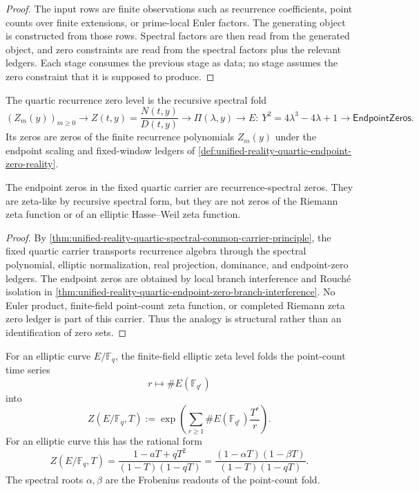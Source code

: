 \begin{proof}
The input rows are finite observations such as recurrence coefficients,
point counts over finite extensions, or prime-local Euler factors.  The
generating object is constructed from those rows.  Spectral factors are
then read from the generated object, and zero constraints are read from
the spectral factors plus the relevant ledgers.  Each stage consumes the
previous stage as data; no stage assumes the zero constraint that it is
supposed to produce.
\end{proof}

\begin{definition}
\label{def:unified-reality-quartic-recurrence-zero-level}
The quartic recurrence zero level is the recursive spectral fold
$$
(Z_m(y))_{m\ge0}
\to
Z(t,y)=\frac{N(t,y)}{D(t,y)}
\to
\Pi(\lambda,y)
\to
E:\ Y^2=4\lambda^3-4\lambda+1
\to
\mathsf{EndpointZeros}.
$$
Its zeros are zeros of the finite recurrence polynomials $Z_m(y)$ under
the endpoint scaling and fixed-window ledgers of
\autoref{def:unified-reality-quartic-endpoint-zero-reality}.
\end{definition}

\begin{theorem}
\label{thm:unified-reality-quartic-endpoint-zeros-recurrence-spectral}
The endpoint zeros in the fixed quartic carrier are recurrence-spectral
zeros.  They are zeta-like by recursive spectral form, but they are not
zeros of the Riemann zeta function or of an elliptic Hasse--Weil zeta
function.
\end{theorem}

\begin{proof}
By
\autoref{thm:unified-reality-quartic-spectral-common-carrier-principle},
the fixed quartic carrier transports recurrence algebra through the
spectral polynomial, elliptic normalization, real projection, dominance,
and endpoint-zero ledgers.  The endpoint zeros are obtained by local
branch interference and Rouch\'e isolation in
\autoref{thm:unified-reality-quartic-endpoint-zero-branch-interference}.
No Euler product, finite-field point-count zeta function, or completed
Riemann zeta zero ledger is part of this carrier.  Thus the analogy is
structural rather than an identification of zero sets.
\end{proof}

\begin{definition}
\label{def:unified-reality-finite-field-elliptic-zeta-level}
For an elliptic curve $E/\mathbb F_q$, the finite-field elliptic zeta
level folds the point-count time series
$$
r\longmapsto \#E(\mathbb F_{q^r})
$$
into
$$
Z(E/\mathbb F_q,T)
:=
\exp\left(
\sum_{r\ge1}
\#E(\mathbb F_{q^r})\frac{T^r}{r}
\right).
$$
For an elliptic curve this has the rational form
$$
Z(E/\mathbb F_q,T)
=
\frac{1-aT+qT^2}{(1-T)(1-qT)}
=
\frac{(1-\alpha T)(1-\beta T)}{(1-T)(1-qT)}.
$$
The spectral roots $\alpha,\beta$ are the Frobenius readouts of the
point-count fold.
\end{definition}

